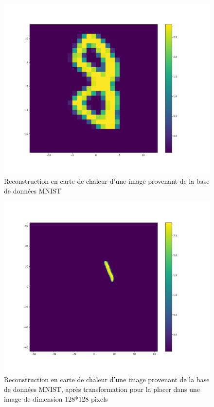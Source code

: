 \begin{figure}[th]
\centering
\includegraphics[scale=0.4]{Figures/MNIST_28}
\decoRule %
\caption[Figure]{Reconstruction en carte de chaleur d'une image provenant de la base de données MNIST}
\label{fig:MNIST_28}
\end{figure}

\begin{figure}[th]
\centering
\includegraphics[scale=0.4]{Figures/MNIST_128}
\decoRule
\caption[Figure]{Reconstruction en carte de chaleur d'une image provenant de la base de données MNIST, après transformation pour la placer dans une image de dimension 128*128 pixels}
\label{fig:MNIST_128}
\end{figure}

